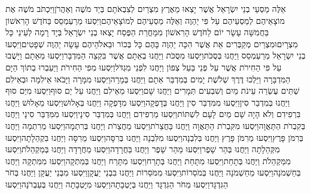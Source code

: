 \documentclass[../main/main.tex]{subfiles}
\begin{document}
\begin{multicols*}{\ncols}
אֵלֶּה מַסְעֵי בְנֵי יִשְׂרָאֵל אֲשֶׁר יָצְאוּ מֵאֶרֶץ מִצְרַיִם לְצִבְאֹתָם בְּיַד מֹשֶׁה וְאַהֲרֹן\PreVerseSpace{}וַיִּכְתֹּב מֹשֶׁה אֶת מוֹצָאֵיהֶם לְמַסְעֵיהֶם עַל פִּי יַהְוֶה וְאֵלֶּה מַסְעֵיהֶם לְמוֹצָאֵיהֶם\PreVerseSpace{}וַיִּסְעוּ מֵרַעְמְסֵס בַּחֹדֶשׁ הָרִאשׁוֹן בַּחֲמִשָּׁה עָשָׂר יוֹם לַחֹדֶשׁ הָרִאשׁוֹן מִמָּחֳרַת הַפֶּסַח יָצְאוּ בְנֵי יִשְׂרָאֵל בְּיָד רָמָה לְעֵינֵי כָּל מִצְרָיִם\PreVerseSpace{}וּמִצְרַיִם מְקַבְּרִים אֵת אֲשֶׁר הִכָּה יַהְוֶה בָּהֶם כָּל בְּכוֹר וּבֵאלֹהֵיהֶם עָשָׂה יַהְוֶה שְׁפָטִים\PreVerseSpace{}וַיִּסְעוּ בְנֵי יִשְׂרָאֵל מֵרַעְמְסֵס וַיַּחֲנוּ בְּסֻכֹּת\PreVerseSpace{}וַיִּסְעוּ מִסֻּכֹּת וַיַּחֲנוּ בְאֵתָם אֲשֶׁר בִּקְצֵה הַמִּדְבָּר\PreVerseSpace{}וַיִּסְעוּ מֵאֵתָם וַיָּשֻׁבוּ\SubEnd{} עַל פִּי הַחִירֹת אֲשֶׁר עַל פְּנֵי בַּעַל צְפוֹן וַיַּחֲנוּ לִפְנֵי מִגְדֹּל\PreVerseSpace{}וַיִּסְעוּ מִפִּי\SubEnd{} הַחִירֹת וַיַּעַבְרוּ בְתוֹךְ הַיָּם הַמִּדְבָּרָה וַיֵּלְכוּ דֶּרֶךְ שְׁלֹשֶׁת יָמִים בְּמִדְבַּר אֵתָם וַיַּחֲנוּ בְּמָרָה\PreVerseSpace{}וַיִּסְעוּ מִמָּרָה וַיָּבֹאוּ אֵילִמָה וּבְאֵילִם שְׁתֵּים עֶשְׂרֵה עֵינֹת מַיִם וְשִׁבְעִים תְּמָרִים וַיַּחֲנוּ שָׁם\PreVerseSpace{}וַיִּסְעוּ מֵאֵילִם וַיַּחֲנוּ עַל יַם סוּף\PreVerseSpace{}וַיִּסְעוּ מִיַּם סוּף וַיַּחֲנוּ בְּמִדְבַּר סִין\PreVerseSpace{}וַיִּסְעוּ מִמִּדְבַּר סִין וַיַּחֲנוּ בְּדָפְקָה\PreVerseSpace{}וַיִּסְעוּ מִדָּפְקָה וַיַּחֲנוּ בְּאָלוּשׁ\PreVerseSpace{}וַיִּסְעוּ מֵאָלוּשׁ וַיַּחֲנוּ בִּרְפִידִם וְלֹא הָיָה שָׁם מַיִם לָעָם לִשְׁתּוֹת\PreVerseSpace{}וַיִּסְעוּ מֵרְפִידִם וַיַּחֲנוּ בְּמִדְבַּר סִינָי\PreVerseSpace{}וַיִּסְעוּ מִמִּדְבַּר סִינָי וַיַּחֲנוּ בְּקִבְרֹת הַתַּאֲוָה\PreVerseSpace{}וַיִּסְעוּ מִקִּבְרֹת הַתַּאֲוָה וַיַּחֲנוּ בַּחֲצֵרֹת\PreVerseSpace{}וַיִּסְעוּ מֵחֲצֵרֹת וַיַּחֲנוּ בְּרִתְמָה\PreVerseSpace{}וַיִּסְעוּ מֵרִתְמָה וַיַּחֲנוּ בְּרִמֹּן פָּרֶץ\PreVerseSpace{}וַיִּסְעוּ מֵרִמֹּן פָּרֶץ וַיַּחֲנוּ בְּלִבְנָה\PreVerseSpace{}וַיִּסְעוּ מִלִּבְנָה וַיַּחֲנוּ בְּרִסָּה\PreVerseSpace{}וַיִּסְעוּ מֵרִסָּה וַיַּחֲנוּ בִּקְהֵלָתָה\PreVerseSpace{}וַיִּסְעוּ מִקְּהֵלָתָה וַיַּחֲנוּ בְּהַר שָׁפֶר\PreVerseSpace{}וַיִּסְעוּ מֵהַר שָׁפֶר וַיַּחֲנוּ בַּחֲרָדָה\PreVerseSpace{}וַיִּסְעוּ מֵחֲרָדָה וַיַּחֲנוּ בְּמַקְהֵלֹת\PreVerseSpace{}וַיִּסְעוּ מִמַּקְהֵלֹת וַיַּחֲנוּ בְּתָחַת\PreVerseSpace{}וַיִּסְעוּ מִתָּחַת וַיַּחֲנוּ בְּתָרַח\PreVerseSpace{}וַיִּסְעוּ מִתָּרַח וַיַּחֲנוּ בְּמִתְקָה\PreVerseSpace{}וַיִּסְעוּ מִמִּתְקָה וַיַּחֲנוּ בְּחַשְׁמֹנָה\PreVerseSpace{}וַיִּסְעוּ מֵחַשְׁמֹנָה וַיַּחֲנוּ בְּמֹסֵרוֹת\PreVerseSpace{}וַיִּסְעוּ מִמֹּסֵרוֹת וַיַּחֲנוּ בִּבְנֵי יַעֲקָן\PreVerseSpace{}וַיִּסְעוּ מִבְּנֵי יַעֲקָן וַיַּחֲנוּ בְּחֹר הַגִּדְגָּד\PreVerseSpace{}וַיִּסְעוּ מֵחֹר הַגִּדְגָּד וַיַּחֲנוּ בְּיָטְבָתָה\PreVerseSpace{}וַיִּסְעוּ מִיָּטְבָתָה וַיַּחֲנוּ בְּעַבְרֹנָה\PreVerseSpace{}וַיִּסְעוּ 
\end{multicols*}
\end{document}
